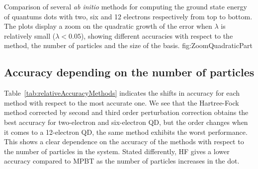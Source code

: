 {Comparison of several \textit{ab initio} methods for computing the ground state energy of quantums dots with two, six and 12 electrons respectively from top to bottom. The plots display a zoom on the quadratic growth of the error when $\lambda$ is relatively small ($\lambda < 0.05$), showing different accuracies with respect to the method, the number of particles and the size of the basis.}
{fig:ZoomQuadraticPart}


\subsection{Accuracy depending on the number of particles}
\label{sec:accuracyNbElectrons}
 Table~\ref{tab:relativeAccuracyMethods} indicates the shifts in accuracy for each method with respect to the most accurate one.
We see that the Hartree-Fock method corrected by second and third order perturbation correction obtains the best accuracy for two-electron  and six-electron QD, but the order changes when it comes to a 12-electron QD, the same method exhibits the worst performance. This shows a clear dependence on the accuracy of the methods with respect to the number of particles in the system. Stated differently, 
HF gives a lower accuracy compared to MPBT as the number of particles increases in the dot.
 
